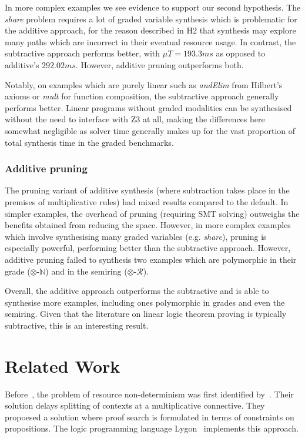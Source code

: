 In more complex examples we see evidence to support our second hypothesis. The
\textit{share} problem requires a lot of graded variable synthesis which is
problematic for the additive approach, for the reason described in H2 that synthesis 
may explore many paths which are incorrect in their eventual resource usage. In
contrast, the subtractive approach performs better, with $\mu{T} =
193.3\textit{ms}$ as opposed to additive's $292.02\textit{ms}$. However,
additive pruning outperforms both.

Notably, on examples which are purely linear such as \textit{andElim} from
Hilbert's axioms or \textit{mult} for function composition, the subtractive
approach generally performs better. Linear programs without graded modalities
can be synthesised without the need to interface with Z3 at all, making the
differences here somewhat negligible as solver time generally makes up for the
vast proportion of total synthesis time in the graded benchmarks.

\subsubsection{Additive pruning}
The pruning variant of additive synthesis (where subtraction
takes place in the premises of multiplicative rules) had mixed results
compared to the default. In simpler examples, the overhead of pruning
(requiring SMT solving) outweighs
the benefits obtained from reducing the space. However, in more
complex examples which involve synthesising many graded variables (e.g. \textit{share}), pruning is
especially powerful, performing better than the subtractive
approach. However, additive pruning failed to synthesis two
 examples which are polymorphic in their grade
 ($\otimes$-$\mathbb{N}$) and in the semiring ($\otimes$-$\mathcal{R}$).


Overall, the additive approach outperforms the subtractive and is able to
synthesise more examples, including ones polymorphic in grades and even the
semiring. Given that the literature on linear logic theorem proving is
typically subtractive, this is an interesting result. 

\section{Related Work}
\label{sec:linear-base-related}
Before~\citet{HODAS1994327}, the problem of resource non-determinism was first
identified by~\citet{harlandpym}. Their solution delays splitting of contexts at
a multiplicative connective. They propoesed a solution where proof search is
formulated in terms of constraints on propositions. The logic programming
language Lygon~\citep{lygon} implements this approach.

